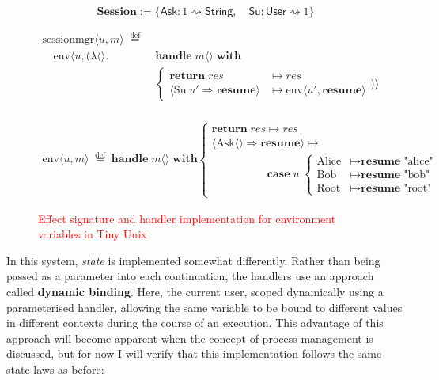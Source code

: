 \documentclass[logo,bsc,singlespacing,parskip]{infthesis}
\begin{document}
\begin{figure}[H]
\centering
\[
\mathsf{\textbf{Session}} := \{ \mathsf{Ask} : 1 \rightsquigarrow \mathsf{String}, \quad \mathsf{Su} : \mathsf{User} \rightsquigarrow 1 \}
\]

\begin{align*}
\text{sessionmgr} \langle u, m \rangle \;\overset{\mathrm{def}}{=}\;& \\
\quad \text{env} \langle u, (\lambda \langle \rangle.\; &\textbf{handle}\; m \langle \rangle\; \textbf{with} \\
&\left\{
\begin{array}{ll}
  \textbf{return}\; res & \mapsto res \\
  \langle \text{Su}\; u' \Rightarrow \textbf{resume} \rangle & \mapsto \text{env} \langle u', \textbf{resume} \rangle
\end{array}
\right.
) \rangle
\end{align*}


 
\[
\begin{array}{l}
\\
\text{env} \langle \mathit{u}, m \rangle \;\overset{\mathrm{def}}{=} \;
\textbf{handle}\; m \langle \rangle\; \textbf{with} \left\{
\begin{array}{ll}
\textbf{return}\; res  \mapsto res \\
\langle \text{Ask} \langle \rangle \Rightarrow \textbf{resume} \rangle  \mapsto \\
\quad\quad\quad\quad\quad\textbf{case}\; \mathit{u}\; \left\{
\begin{array}{ll}
\text{Alice} & \mapsto \textbf{resume}\; \text{"alice"} \\
\text{Bob} & \mapsto \textbf{resume}\; \text{"bob"} \\
\text{Root} & \mapsto \textbf{resume}\; \text{"root"}
\end{array}
\right.
\end{array}
\right.
\end{array}
\]

\caption{\textcolor{red}{Effect signature and handler implementation for environment variables in Tiny Unix}}
\label{fig:env-state-handler}
\end{figure}

In this system, \textit{state} is implemented somewhat differently. Rather than being passed as a parameter into each continuation, the handlers use an approach called \textbf{dynamic binding}. Here, the current user, scoped dynamically using a parameterised handler, allowing the same variable to be bound to different values in different contexts during the course of an execution. This advantage of this approach will become apparent when the concept of process management is discussed, but for now I will verify that this implementation follows the same state laws as before:
\end{document}
